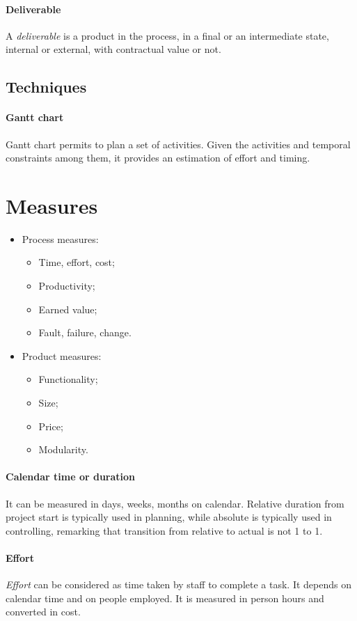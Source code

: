 \paragraph{Deliverable}
A \emph{deliverable} is a product in the process, in a final or an intermediate state, internal or external, with contractual value or not.

\subsection{Techniques}
\paragraph{Gantt chart}
Gantt chart permits to plan a set of activities. Given the activities and temporal constraints among them, it provides an estimation of effort and timing.

\section{Measures}
\begin{itemize}
\item Process measures:
\begin{itemize}
\item Time, effort, cost;
\item Productivity;
\item Earned value;
\item Fault, failure, change.
\end{itemize}
\item Product measures:
\begin{itemize}
\item Functionality;
\item Size;
\item Price;
\item Modularity.
\end{itemize}
\end{itemize}

\paragraph{Calendar time or duration}
It can be measured in days, weeks, months on calendar. Relative duration from project start is typically used in planning, while absolute is typically used in controlling, remarking that transition from relative to actual is not 1 to 1.

\paragraph{Effort}
\emph{Effort} can be considered as time taken by staff to complete a task. It depends on calendar time and on people employed. It is measured in person hours and converted in cost.

